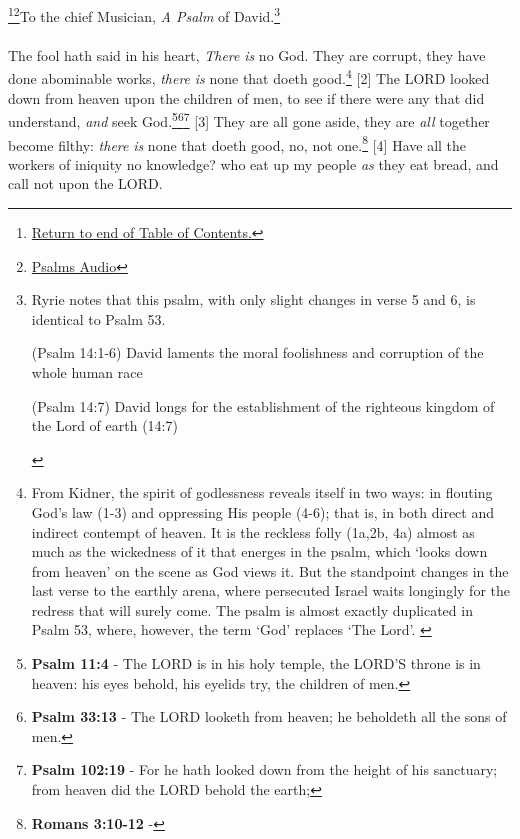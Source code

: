 \footnote{\textcolor[cmyk]{0.99998,1,0,0}{\hyperlink{TOC}{Return to end of Table of Contents.}}}\footnote{\href{https://www.audioverse.org/english/audiobibles/books/ENGKJV/O/Ps/1}{\textcolor[cmyk]{0.99998,1,0,0}{Psalms Audio}}}\textcolor[cmyk]{0.99998,1,0,0}{To the chief Musician, \emph{A Psalm} of David.}\footnote{Ryrie notes that this psalm, with only slight changes in verse 5 and 6, is identical to Psalm 53. \cite{ryrie2008ryrieKJV}
\begin{compactenum}[I.][3]
\item (Psalm 14:1-6) David laments the moral foolishness and corruption of the whole human race  
\item (Psalm 14:7) David  longs for the establishment of the righteous kingdom of the Lord of earth (14:7)
\end{compactenum} }\\
\\
\textcolor[cmyk]{0.99998,1,0,0}{The fool hath said in his heart, \emph{There} \emph{is} no God. They are corrupt, they have done abominable works, \emph{there} \emph{is} none that doeth good.}\footnote{From Kidner, the spirit of godlessness reveals itself in two ways:  in flouting God's law (1-3) and oppressing His people (4-6); that is, in both direct and indirect contempt of heaven. It is the reckless folly (1a,2b, 4a) almost as much as the wickedness of it that energes in the psalm, which `looks down from heaven' on the scene as God views it. But the standpoint changes in the last verse to the earthly arena, where persecuted Israel waits longingly for the redress that will surely come. The psalm is almost exactly duplicated in Psalm 53, where, however, the term `God' replaces `The Lord'. \cite{kidner2014psalmsV1} } 
[2] \textcolor[cmyk]{0.99998,1,0,0}{The LORD looked down from heaven upon the children of men, to see if there were any that did understand, \emph{and} seek God.}\footnote{\textbf{Psalm 11:4} - The LORD is in his holy temple, the LORD'S throne is in heaven: his eyes behold, his eyelids try, the children of men.}\footnote{\textbf{Psalm 33:13} - The LORD looketh from heaven; he beholdeth all the sons of men.}\footnote{\textbf{Psalm 102:19} - For he hath looked down from the height of his sanctuary; from heaven did the LORD behold the earth;}
[3] \textcolor[cmyk]{0.99998,1,0,0}{They are all gone aside, they are \emph{all} together become filthy: \emph{there} \emph{is} none that doeth good, no, not one.}\footnote{\textbf{Romans 3:10-12} - }
[4] \textcolor[cmyk]{0.99998,1,0,0}{Have all the workers of iniquity no knowledge? who eat up my people \emph{as} they eat bread, and call not upon the LORD.}%
